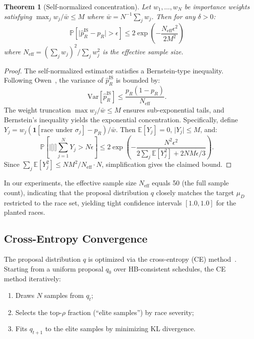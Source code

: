 \documentclass[11pt]{article}
\newtheorem{theorem}{Theorem}[section]
\newcommand{\E}{\mathbb{E}}
\newcommand{\Prob}{\mathbb{P}}
\newcommand{\Var}{\mathrm{Var}}
\newcommand{\abs}[1]{\lvert #1 \rvert}
\begin{document}
\begin{theorem}[Self-normalized concentration]
\label{thm:concentration}
Let $w_1, \ldots, w_N$ be importance weights satisfying
$\max_j w_j / \bar{w} \leq M$ where
$\bar{w} = N^{-1}\sum_j w_j$.
Then for any $\delta > 0$:
\[
  \Prob\!\left[\abs{\hat{p}_R^{\text{IS}} - p_R} > \epsilon\right]
  \leq 2 \exp\!\left(-\frac{N_{\text{eff}} \epsilon^2}{2M^2}\right)
\]
where $N_{\text{eff}} = (\sum_j w_j)^2 / \sum_j w_j^2$ is the effective sample size.
\end{theorem}

\begin{proof}
The self-normalized estimator satisfies a Bernstein-type inequality.
Following Owen~\cite{owen2013monte}, the variance of $\hat{p}_R^{\text{IS}}$
is bounded by:
\[
  \Var[\hat{p}_R^{\text{IS}}] \leq \frac{p_R(1-p_R)}{N_{\text{eff}}}.
\]
The weight truncation $\max w_j / \bar{w} \leq M$ ensures sub-exponential
tails, and Bernstein's inequality yields the exponential concentration.
Specifically, define $Y_j = w_j(\mathbf{1}[\text{race under }\sigma_j] - p_R)/\bar{w}$.
Then $\E[Y_j] = 0$, $\abs{Y_j} \leq M$, and:
\[
  \Prob\!\left[\abs[\Big]{\sum_{j=1}^N Y_j} > N\epsilon\right]
  \leq 2\exp\!\left(-\frac{N^2\epsilon^2}{2\sum_j \E[Y_j^2] + 2NM\epsilon/3}\right).
\]
Since $\sum_j \E[Y_j^2] \leq NM^2/N_{\text{eff}} \cdot N$, simplification
gives the claimed bound.
\end{proof}

In our experiments, the effective sample size $N_{\text{eff}}$ equals 50
(the full sample count), indicating that the proposal distribution $q$
closely matches the target $\mu_D$ restricted to the race set, yielding
tight confidence intervals $[1.0, 1.0]$ for the planted races.

\subsection{Cross-Entropy Convergence}
\label{app:ce-convergence}

The proposal distribution $q$ is optimized via the cross-entropy (CE)
method~\cite{rubinstein2004cross}. Starting from a uniform proposal $q_0$
over HB-consistent schedules, the CE method iteratively:
\begin{enumerate}[nosep]
\item Draws $N$ samples from $q_t$;
\item Selects the top-$\rho$ fraction (``elite samples'') by race severity;
\item Fits $q_{t+1}$ to the elite samples by minimizing KL divergence.
\end{enumerate}
\end{document}
